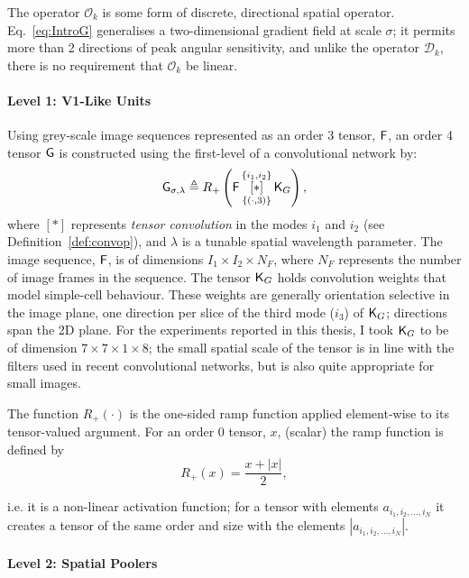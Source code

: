 The operator $\mathcal{O}_k$ is some form of discrete, directional spatial operator. Eq.~\ref{eq:IntroG} generalises a two-dimensional gradient field at scale $\sigma$; it permits more than 2 directions of peak angular sensitivity, and unlike the operator $\mathcal{D}_k$, there is no requirement that $\mathcal{O}_k$ be linear.

\paragraph*{Level 1: V1-Like Units} 

Using grey-scale image sequences represented as an order 3 tensor, $\mathsf{F}$, an order 4 tensor $\mathsf{G}$ is constructed using the first-level of a convolutional network by:
\begin{equation}
\mathsf{G}_{\sigma,\lambda} \triangleq R_+ \left ( \mathsf{F} \, 
   \underset{\lbrace (\cdot,3)\rbrace}{\overset{\lbrace i_1,i_2\rbrace}{[ \ast ]}}\, {\mathsf{K}_{G}} \right ),
\end{equation}
where $[ \ast ]$ represents \textit{tensor convolution} in the modes $i_1$ and $i_2$ (see Definition~\ref{def:convop}), and $\lambda$ is a tunable spatial wavelength parameter. The image sequence, $\mathsf{F}$, is of dimensions $I_1\times I_2 \times N_F$, where $N_F$ represents the number of image frames in the sequence. The tensor $\mathsf{K}_{G}$ holds convolution weights that model simple-cell behaviour. These weights are generally orientation selective in the image plane, one direction per slice of the third mode ($i_3$) of $\mathsf{K}_{G}$; directions span the 2D plane. For the experiments reported in this thesis, I took $\mathsf{K}_{G}$ to be of dimension $7 \times 7 \times 1\times 8$; the small spatial scale of the tensor is in line with the filters used in recent convolutional networks, but is also quite appropriate for small images.

The function $R_+(\cdot)$ is the one-sided ramp function applied element-wise to its tensor-valued argument. For an order $0$ tensor, $x$, (scalar) the ramp function is defined by
\begin{equation}
R_+(x) = \frac{x + |x|}{2},
\end{equation}

i.e. it is a non-linear activation function; for a tensor with elements $a_{i_1,i_2,...,i_N}$ it creates a tensor of the same order and size with the elements $|a_{i_1,i_2,...,i_N}|$. 

\paragraph*{Level 2: Spatial Poolers} 


